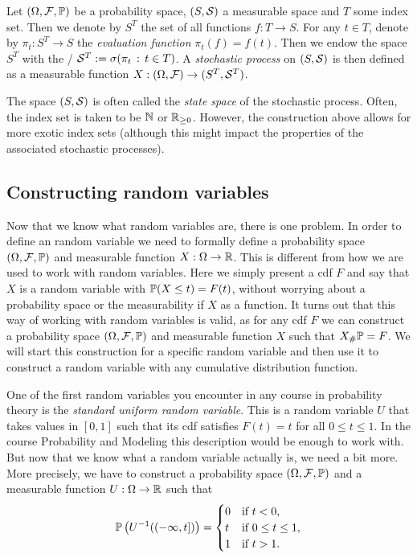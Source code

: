 \begin{example}
Let $(\Omega,\mathcal F,\mathbb P)$ be a probability space, $(S,\mathcal S)$ a measurable space and $T$ some index set. Then we denote by $S^T$ the set of all functions $f : T \to S$. For any $t \in T$, denote by $\pi_t : S^T \to S$ the \emph{evaluation function} $\pi_t(f) = f(t)$. Then we endow the space $S^T$ with the \sigalg/ $\mathcal S^T := \sigma(\pi_t \, : \, t\in T)$. A \emph{stochastic process} on $(S,\mathcal S)$ is then defined as a measurable function $X : (\Omega,\mathcal F) \to (S^T, \mathcal S^T)$.

The space $(S,\mathcal S)$ is often called the \emph{state space} of the stochastic process. Often, the index set is taken to be $\mathbb N$ or $\mathbb R_{\ge 0}$. However, the construction above allows for more exotic index sets (although this might impact the properties of the associated stochastic processes).
\end{example}

\subsection{Constructing random variables}

Now that we know what random variables are, there is one problem. In order to define an random variable we need to formally define a probability space $(\Omega, \mathcal F, \mathbb P)$ and measurable function $X: \Omega \to \mathbb R$. This is different from how we are used to work with random variables. Here we simply present a cdf $F$ and say that $X$ is a random variable with $\mathbb P(X \le t) = F(t)$, without worrying about a probability space or the measurability if $X$ as a function. It turns out that this way of working with random variables is valid, as for any cdf $F$ we can construct a probability space $(\Omega, \mathcal F, \mathbb P)$ and measurable function $X$ such that $X_\# \mathbb P = F$. We will start this construction for a specific random variable and then use it to construct a random variable with any cumulative distribution function.

One of the first random variables you encounter in any course in probability theory is the \emph{standard uniform random variable}. This is a random variable $U$ that takes values in $[0,1]$ such that its cdf satisfies $F(t) = t$ for all $0\le t \le 1$. In the course Probability and Modeling this description would be enough to work with. But now that we know what a random variable actually is, we need a bit more. More precisely, we have to construct a probability space $(\Omega,\mathcal F, \mathbb P)$ and a measurable function $U : \Omega \to \mathbb R$ such that 
\begin{equation}\label{eq:cdf_uniform_rv}
	\mathbb P\left(U^{-1}((-\infty,t])\right) = \begin{cases}
		0 &\text{if } t < 0,\\
		t &\text{if } 0 \le t\le 1,\\
		1 &\text{if } t > 1.
	\end{cases}
\end{equation}

